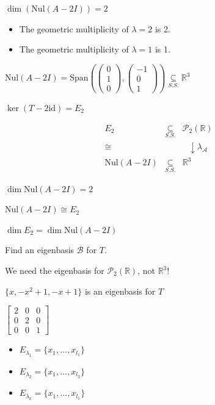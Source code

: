 \documentclass[11pt,fleqn]{book} %
\begin{document}
$\dim(\mathrm{Nul}(A - 2I)) = 2$

\begin{itemize}
    \item The geometric multiplicity of $\lambda = 2$  is 2. 
    \item The geometric multiplicity of $\lambda = 1$ is 1. 
\end{itemize}

$\mathrm{Nul}(A - 2I) = \mathrm{Span}\left(\begin{pmatrix} 0 \\ 1 \\ 0 \end{pmatrix}, \begin{pmatrix} -1 \\ 0 \\ 1 \end{pmatrix}\right) \underset{S.S.}{\subseteq} \mathbb{R}^3$

$\ker(T - 2\mathrm{id}) = E_2$

$$\begin{matrix} E_2 &\underset{S.S.}\subseteq &\mathcal{P}_2(\mathbb{R}) \\ \cong & &~~~\downarrow \lambda_\mathcal{A} \\ \mathrm{Nul}(A - 2I) &\underset{S.S.}{\subseteq} &\mathbb{R}^3 \end{matrix}$$

$\dim \mathrm{Nul}(A - 2I) = 2$

$\mathrm{Nul}(A - 2I) \cong E_2$

$\dim E_2 = \dim \mathrm{Nul}(A - 2I)$

Find an eigenbasis $\mathcal{B}$ for $T$. 

 We need the eigenbasis for $\mathcal{P_2}(\mathbb{R})$, not $\mathbb{R}^3$!

$\{ x, -x^2+1, -x+1 \}$ is an eigenbasis for $T$


$\begin{bmatrix} 2 &0 &0 \\ 0 &2 &0 \\ 0 &0 &1 \end{bmatrix}$

\begin{itemize}
    \item $E_{\lambda_1} = \{ x_1, \dots, x_{l_1} \}$
    \item $E_{\lambda_2} = \{ x_1, \dots, x_{l_2} \}$
    \item $E_{\lambda_k} = \{ x_1, \dots, x_{l_1} \}$
\end{itemize}
\end{document}

